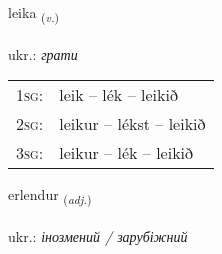 \documentclass[frontgrid, backgrid]{flacards}\usepackage[]{graphicx}\usepackage[]{xcolor}
\begin{document}
\renewcommand{\flhead}{\vskip5pt \fboxsep=0pt {\small\bfseries\footnotesize Sagnorð | дієслово}}
\renewcommand{\fcfoot}{\vskip5pt \fboxsep=0pt \hspace{2pt}{\small\bfseries\footnotesize 1K}}

\renewcommand{\blhead}{\vskip5pt {\small\bfseries\footnotesize Sagnorð | дієслово }}
\renewcommand{\bcfoot}{\vskip5pt \hspace{2pt}{\small\bfseries\footnotesize 1K}}


{leika \small{\textsubscript{(\textit{v.})}} \\[1ex] %
\textphonetic{[leiːka]} \\
ukr.: \emph{грати} \\  [2ex]
\renewcommand*{\arraystretch}{0.8}
\begin{tabular}{p{1cm}l}
\textsc{1sg}: & leik -- lék -- leikið \\ 
\textsc{2sg}: & leikur -- lékst -- leikið \\ 
\textsc{3sg}: & leikur -- lék -- leikið \\ 
\end{tabular}
}

\renewcommand{\flhead}{\vskip5pt \fboxsep=0pt {\small\bfseries\footnotesize Lýsingarorð | прикметник}}
\renewcommand{\fcfoot}{\vskip5pt \fboxsep=0pt \hspace{2pt}{\small\bfseries\footnotesize 1K}}

\renewcommand{\blhead}{\vskip5pt {\small\bfseries\footnotesize Lýsingarorð | прикметник }}
\renewcommand{\bcfoot}{\vskip5pt \hspace{2pt}{\small\bfseries\footnotesize 1K}}


{erlendur \small{\textsubscript{(\textit{adj.})}} \\[1ex] %
\textphonetic{[ɛrlɛntʏr]} \\
ukr.: \emph{інозмений / зарубіжний} \\  [2ex]
\renewcommand*{\arraystretch}{0.8}
}
\end{document}
